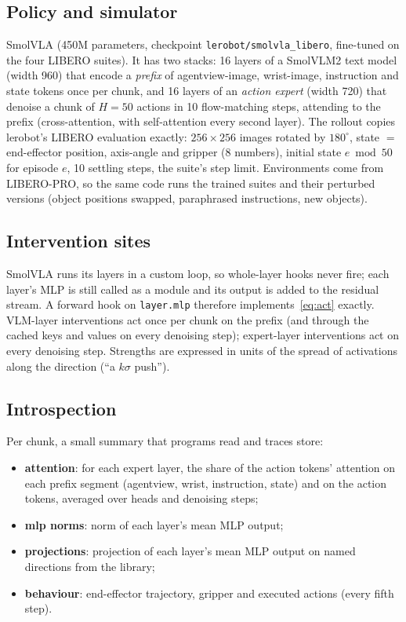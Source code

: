 \documentclass[11pt]{article}
\begin{document}
\subsection{Policy and simulator}
SmolVLA (450M parameters, checkpoint \texttt{lerobot/smolvla\_libero}, fine-tuned on the four LIBERO suites). It has two
stacks: 16 layers of a SmolVLM2 text model (width 960) that encode a \emph{prefix} of agentview-image, wrist-image,
instruction and state tokens once per chunk, and 16 layers of an \emph{action expert} (width 720) that denoise a chunk of
$H=50$ actions in 10 flow-matching steps, attending to the prefix (cross-attention, with self-attention every second
layer). The rollout copies lerobot's LIBERO evaluation exactly: $256{\times}256$ images rotated by $180^\circ$, state
$=$ end-effector position, axis-angle and gripper (8 numbers), initial state $e \bmod 50$ for episode $e$, 10 settling steps,
the suite's step limit. Environments come from LIBERO-PRO, so the same code runs the trained suites and their perturbed
versions (object positions swapped, paraphrased instructions, new objects).

\subsection{Intervention sites}
SmolVLA runs its layers in a custom loop, so whole-layer hooks never fire; each layer's MLP is still called as a module and
its output is added to the residual stream. A forward hook on \texttt{layer.mlp} therefore implements~\eqref{eq:act}
exactly. VLM-layer interventions act once per chunk on the prefix (and through the cached keys and values on every
denoising step); expert-layer interventions act on every denoising step. Strengths are expressed in units of the spread of
activations along the direction (``a $k\sigma$ push'').

\subsection{Introspection}\label{sec:introspect}
Per chunk, a small summary that programs read and traces store:
\begin{itemize}
\item \textbf{attention}: for each expert layer, the share of the action tokens' attention on each prefix segment (agentview,
wrist, instruction, state) and on the action tokens, averaged over heads and denoising steps;
\item \textbf{mlp norms}: norm of each layer's mean MLP output;
\item \textbf{projections}: projection of each layer's mean MLP output on named directions from the library;
\item \textbf{behaviour}: end-effector trajectory, gripper and executed actions (every fifth step).
\end{itemize}
\end{document}
